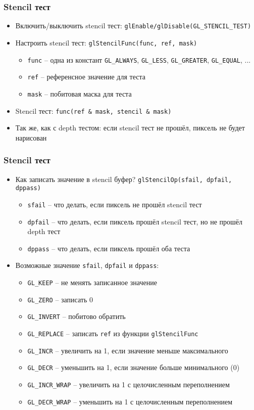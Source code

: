 \documentclass{beamer}
\begin{document}
\begin{frame}[fragile]
\frametitle{Stencil тест}
\begin{itemize}
\item Включить/выключить stencil тест: \verb|glEnable/glDisable(GL_STENCIL_TEST)|
\pause
\item Настроить stencil тест: \verb|glStencilFunc(func, ref, mask)|
\begin{itemize}
\item \verb|func| -- одна из констант \verb|GL_ALWAYS|, \verb|GL_LESS|, \verb|GL_GREATER|, \verb|GL_EQUAL|, ...
\item \verb|ref| -- референсное значение для теста
\item \verb|mask| -- побитовая маска для теста
\end{itemize}
\item Stencil тест: \verb|func(ref & mask, stencil & mask)|
\pause
\item Так же, как с depth тестом: если stencil тест не прошёл, пиксель не будет нарисован
\end{itemize}
\end{frame}

\begin{frame}[fragile]
\frametitle{Stencil тест}
\begin{itemize}
\item Как записать значение в stencil буфер? \pause \verb|glStencilOp(sfail, dpfail, dppass)|
\begin{itemize}
\item \verb|sfail| -- что делать, если пиксель не прошёл stencil тест
\item \verb|dpfail| -- что делать, если пиксель прошёл stencil тест, но не прошёл depth тест
\item \verb|dppass| -- что делать, если пиксель прошёл оба теста
\end{itemize}
\pause
\item Возможные значение \verb|sfail|, \verb|dpfail| и \verb|dppass|:
\begin{itemize}
\item \verb|GL_KEEP| -- не менять записанное значение
\item \verb|GL_ZERO| -- записать 0
\item \verb|GL_INVERT| -- побитово обратить
\item \verb|GL_REPLACE| -- записать \verb|ref| из функции \verb|glStencilFunc|
\item \verb|GL_INCR| -- увеличить на 1, если значение меньше максимального
\item \verb|GL_DECR| -- уменьшить на 1, если значение больше минимального (0)
\item \verb|GL_INCR_WRAP| -- увеличить на 1 с целочисленным переполнением
\item \verb|GL_DECR_WRAP| -- уменьшить на 1 с целочисленным переполнением
\end{itemize}
\end{itemize}
\end{frame}
\end{document}

